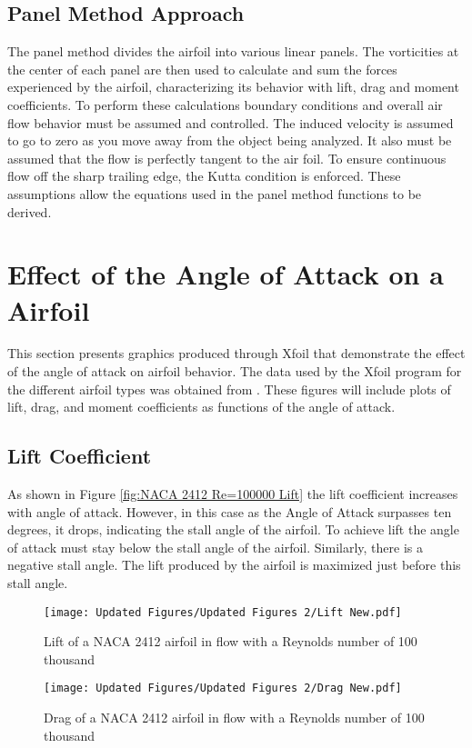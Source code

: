 \documentclass{article}
\begin{document}
\subsection{Panel Method Approach}
The panel method divides the airfoil into various linear panels. The vorticities at the center of each panel are then used to calculate and sum the forces experienced by the airfoil, characterizing its behavior with lift, drag and moment coefficients. To perform these calculations boundary conditions and overall air flow behavior must be assumed and controlled. The induced velocity is assumed to go to zero as you move away from the object being analyzed. It also must be assumed that the flow is perfectly tangent to the air foil. To ensure continuous flow off the sharp trailing edge, the Kutta condition is enforced. These assumptions allow the equations used in the panel method functions to be derived.

\section{Effect of the Angle of Attack on a Airfoil}
This section presents graphics produced through Xfoil that demonstrate the effect of the angle of attack on airfoil behavior. The data used by the Xfoil program for the different airfoil types was obtained from \cite{naca0012h}. These figures will include plots of lift, drag, and moment coefficients as functions of the angle of attack.

\subsection{Lift Coefficient}
As shown in Figure \ref{fig:NACA 2412 Re=100000 Lift} the lift coefficient increases with angle of attack. However, in this case as the Angle of Attack surpasses ten degrees, it drops, indicating the stall angle of the airfoil. To achieve lift the angle of attack must stay below the stall angle of the airfoil. Similarly, there is a negative stall angle. The lift produced by the airfoil is maximized just before this stall angle.
\begin{figure}[h]
    \centering
\begin{minipage}[b]{0.45\textwidth}
\centering
\texttt{[image: Updated Figures/Updated Figures 2/Lift New.pdf]}
\caption{Lift of a NACA 2412 airfoil in flow with a Reynolds number of 100 thousand}
\label{fig:NACA 2412 Re=100000 Lift}
\end{minipage}
\begin{minipage}[b]{0.45\textwidth}
\centering
\texttt{[image: Updated Figures/Updated Figures 2/Drag New.pdf]}
\caption{Drag of a NACA 2412 airfoil in flow with a Reynolds number of 100 thousand}
\label{fig:NACA 2412 Re=100000 Drag}
\end{minipage}
\end{figure}
\end{document}
